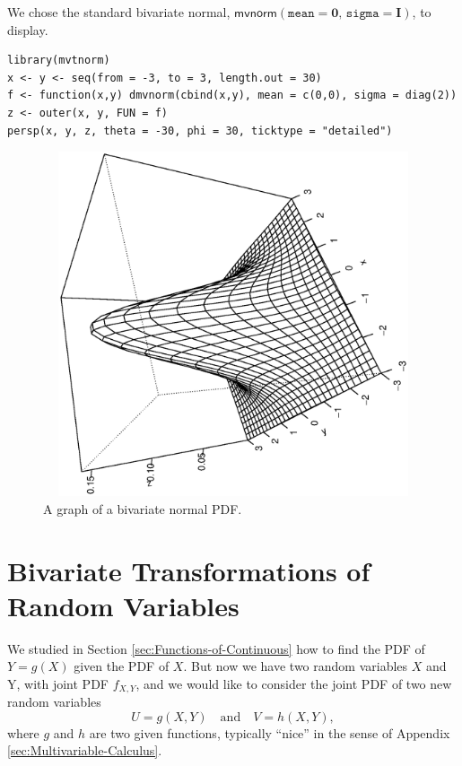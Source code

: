 \documentclass[captions=tableheading]{scrbook}
\begin{document}
We chose the standard bivariate normal, \(\mathsf{mvnorm}(\mathtt{mean}=\mathbf{0},\,\mathtt{sigma}=\mathbf{I})\), to display.


\begin{verbatim}
library(mvtnorm)
x <- y <- seq(from = -3, to = 3, length.out = 30)
f <- function(x,y) dmvnorm(cbind(x,y), mean = c(0,0), sigma = diag(2))
z <- outer(x, y, FUN = f)
persp(x, y, z, theta = -30, phi = 30, ticktype = "detailed")
\end{verbatim}





\begin{figure}[th]
  \includegraphics[width=5in, height=4in]{ps/mvnorm-pdf.ps}
  \caption[Graph of a bivariate normal PDF]{\small A graph of a bivariate normal PDF.}
  \label{fig:mvnorm-pdf}
\end{figure}
\section{Bivariate Transformations of Random Variables}
\label{sec-7-7}

\label{sec:Transformations-Multivariate}

We studied in Section \ref{sec:Functions-of-Continuous} how to find the PDF of \(Y=g(X)\) given the PDF of \(X\). But now we have two random variables \(X\) and Y, with joint PDF \(f_{X,Y}\), and we would like to consider the joint PDF of two new random variables
\begin{equation}
U=g(X,Y)\quad\mbox{and}\quad V=h(X,Y),
\end{equation}
where \(g\) and \(h\) are two given functions, typically ``nice'' in the sense of Appendix \ref{sec:Multivariable-Calculus}. 
\end{document}
